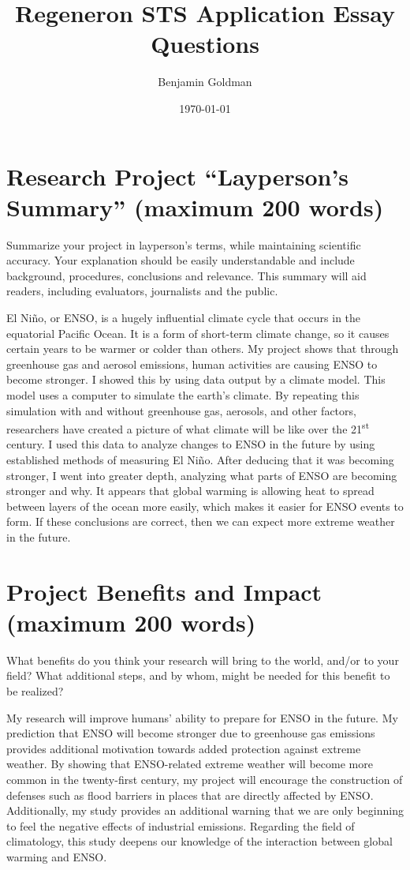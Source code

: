 \documentclass[little]{basic}
\author{Benjamin Goldman}
\date{\today}
\title{Regeneron STS Application Essay Questions}
\begin{document}
\maketitle

\section{Research Project “Layperson’s Summary” (maximum 200 words)}
\label{sec:org77e12e2}
Summarize your project in layperson’s terms, while maintaining scientific accuracy. Your explanation should be easily understandable and include background, procedures, conclusions and relevance. This summary will aid readers, including evaluators, journalists and the public.

El Niño, or ENSO, is a hugely influential climate cycle that occurs in the equatorial Pacific Ocean. It is a form of short-term climate change, so it causes certain years to be warmer or colder than others. My project shows that through greenhouse gas and aerosol emissions, human activities are causing ENSO to become stronger. I showed this by using data output by a climate model. This model uses a computer to simulate the earth's climate. By repeating this simulation with and without greenhouse gas, aerosols, and other factors, researchers have created a picture of what climate will be like over the 21\textsuperscript{st} century. I used this data to analyze changes to ENSO in the future by using established methods of measuring El Niño. After deducing that it was becoming stronger, I went into greater depth, analyzing what parts of ENSO are becoming stronger and why. It appears that global warming is allowing heat to spread between layers of the ocean more easily, which makes it easier for ENSO events to form. If these conclusions are correct, then we can expect more extreme weather in the future.

\section{Project Benefits and Impact (maximum 200 words)}
\label{sec:org1415842}
What benefits do you think your research will bring to the world, and/or to your field? What additional steps, and by whom, might be needed for this benefit to be realized?

My research will improve humans' ability to prepare for ENSO in the future. My prediction that ENSO will become stronger due to greenhouse gas emissions provides additional motivation towards added protection against extreme weather. By showing that ENSO-related extreme weather will become more common in the twenty-first century, my project will encourage the construction of defenses such as flood barriers in places that are directly affected by ENSO. Additionally, my study provides an additional warning that we are only beginning to feel the negative effects of industrial emissions. Regarding the field of climatology, this study deepens our knowledge of the interaction between global warming and ENSO.
\end{document}
